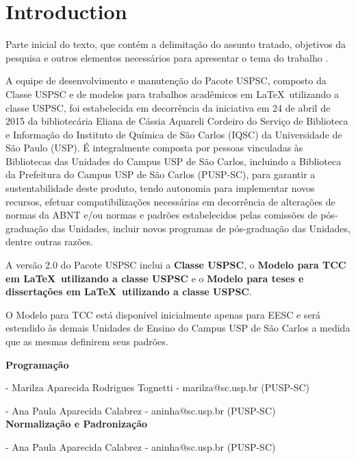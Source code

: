 
\chapter[Introduction]{Introduction}


Parte inicial do texto, que contém a delimitação do assunto tratado, objetivos da pesquisa e outros elementos necessários para apresentar o tema do trabalho \cite{sibi2016}.

A equipe de desenvolvimento e manutenção do Pacote USPSC, composto da Classe USPSC e de modelos para trabalhos acadêmicos em \LaTeX\ utilizando a classe USPSC, foi estabelecida em decorrência da iniciativa em 24 de abril de 2015 da bibliotecária Eliana de Cássia Aquareli Cordeiro do Serviço de Biblioteca e Informação do Instituto de Química de São Carlos (IQSC) da Universidade de São Paulo (USP). É integralmente composta por pessoas vinculadas às Bibliotecas das Unidades do Campus USP de São Carlos, incluindo a Biblioteca da Prefeitura do Campus USP de São Carlos (PUSP-SC), para garantir a sustentabilidade deste produto, tendo autonomia para implementar novos recursos, efetuar compatibilizações necessárias em decorrência de alterações de normas da ABNT e/ou normas e padrões estabelecidos pelas comissões de pós-graduação das Unidades, incluir novos programas de pós-graduação das Unidades, dentre outras razões. 

A versão 2.0 do Pacote USPSC inclui a \textbf{Classe USPSC}, o \textbf{Modelo para TCC em \LaTeX\ utilizando a classe USPSC} e o \textbf{Modelo para teses e dissertações em \LaTeX\ utilizando a classe USPSC}.

O Modelo para TCC está disponível inicialmente apenas para EESC e será estendido às demais Unidades de Ensino do Campus USP de São Carlos a medida que as mesmas definirem seus padrões.

\textbf{Programação}

  - Marilza Aparecida Rodrigues Tognetti - marilza@sc.usp.br (PUSP-SC)
		
  - Ana Paula Aparecida Calabrez - aninha@sc.usp.br (PUSP-SC) \\
	
	
\textbf{Normalização e Padronização}

   - Ana Paula Aparecida Calabrez - aninha@sc.usp.br (PUSP-SC)
	
